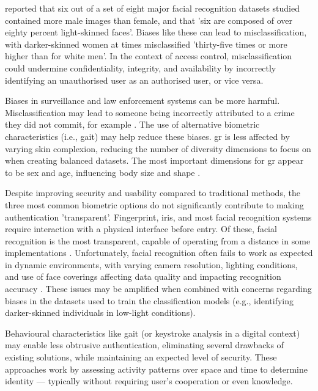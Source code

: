 \cite{leslieUnderstandingBiasFacial2020} reported that six out of a set of eight major facial recognition datasets studied contained more male images than female, and that 'six are composed of over eighty percent light-skinned faces'.
Biases like these can lead to misclassification, with darker-skinned women at times misclassified 'thirty-five times or more higher than for white men'.
In the context of access control, misclassification could undermine confidentiality, integrity, and availability by incorrectly identifying an unauthorised user as an authorised user, or vice versa.

Biases in surveillance and law enforcement systems can be more harmful.
Misclassification may lead to someone being incorrectly attributed to a crime they did not commit, for example \parencite{moyHowPoliceTechnology2019}.
The use of alternative biometric characteristics (i.e., gait) may help reduce these biases.
\ac{gr} is less affected by varying skin complexion, reducing the number of diversity dimensions to focus on when creating balanced datasets.
The most important dimensions for \ac{gr} appear to be sex and age, influencing body size and shape \parencite{guanGeneralizationPowerFace2014}.

Despite improving security and usability compared to traditional methods, the three most common biometric options do not significantly contribute to making authentication 'transparent'.
Fingerprint, iris, and most facial recognition systems require interaction with a physical interface before entry.
Of these, facial recognition is the most transparent, capable of operating from a distance in some implementations \parencite{boonedamFacialRecognitionSystem2024}.
Unfortunately, facial recognition often fails to work as expected in dynamic environments, with varying camera resolution, lighting conditions, and use of face coverings affecting data quality and impacting recognition accuracy \parencite{brajeIlluminationEffectsFace1998}.
These issues may be amplified when combined with concerns regarding biases in the datasets used to train the classification models (e.g., identifying darker-skinned individuals in low-light conditions).

Behavioural characteristics like gait (or keystroke analysis in a digital context) may enable less obtrusive authentication, eliminating several drawbacks of existing solutions, while maintaining an expected level of security.
These approaches work by assessing activity patterns over space and time to determine identity --- typically without requiring user's cooperation or even knowledge.
